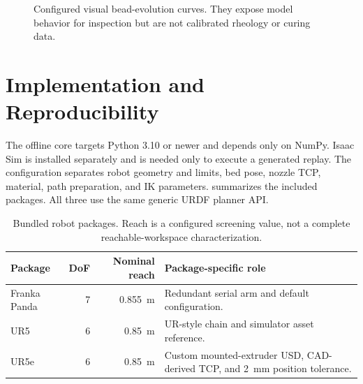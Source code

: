 \documentclass[letterpaper,10pt,conference]{ieeeconf}
\begin{document}
\begin{figure}[!t]
\centering
{}
\caption{Configured visual bead-evolution curves.  They expose model behavior
for inspection but are not calibrated rheology or curing data.}
\label{fig:evolution}
\end{figure}

\section{Implementation and Reproducibility}

The offline core targets Python 3.10 or newer and depends only on NumPy.  Isaac
Sim is installed separately and is needed only to execute a generated replay.
The configuration separates robot geometry and limits, bed pose, nozzle TCP,
material, path preparation, and IK parameters.   summarizes
the included packages.  All three use the same generic URDF planner API.

\begin{table}[!t]
\centering
\caption{Bundled robot packages.  Reach is a configured screening value, not a
complete reachable-workspace characterization.}
\label{tab:robots}
\footnotesize
\begin{tabularx}{\textwidth}{@{}lrrX@{}}
\toprule
Package & DoF & Nominal reach & Package-specific role \\
\midrule
Franka Panda & 7 & \SI{0.855}{\meter} & Redundant serial arm and default configuration. \\
UR5 & 6 & \SI{0.85}{\meter} & UR-style chain and simulator asset reference. \\
UR5e & 6 & \SI{0.85}{\meter} & Custom mounted-extruder USD, CAD-derived TCP, and \SI{2}{\milli\meter} position tolerance. \\
\bottomrule
\end{tabularx}
\end{table}
\end{document}
